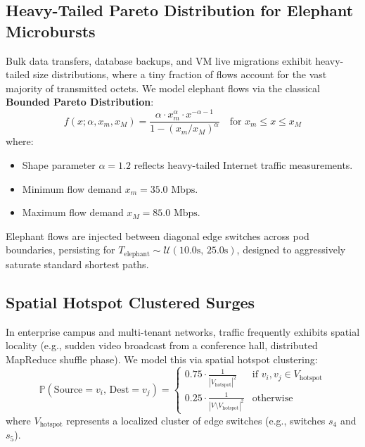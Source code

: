 \subsection{Heavy-Tailed Pareto Distribution for Elephant Microbursts}
Bulk data transfers, database backups, and VM live migrations exhibit heavy-tailed size distributions, where a tiny fraction of flows account for the vast majority of transmitted octets. We model elephant flows via the classical \textbf{Bounded Pareto Distribution}:
\begin{equation}
    f(x; \alpha, x_m, x_M) = \frac{\alpha \cdot x_m^\alpha \cdot x^{-\alpha - 1}}{1 - (x_m / x_M)^\alpha} \quad \text{for } x_m \le x \le x_M
\end{equation}
where:
\begin{itemize}
    \item Shape parameter $\alpha = 1.2$ reflects heavy-tailed Internet traffic measurements.
    \item Minimum flow demand $x_m = 35.0\text{ Mbps}$.
    \item Maximum flow demand $x_M = 85.0\text{ Mbps}$.
\end{itemize}
Elephant flows are injected between diagonal edge switches across pod boundaries, persisting for $T_{\text{elephant}} \sim \mathcal{U}(10.0\text{s}, \, 25.0\text{s})$, designed to aggressively saturate standard shortest paths.

\subsection{Spatial Hotspot Clustered Surges}
In enterprise campus and multi-tenant networks, traffic frequently exhibits spatial locality (e.g., sudden video broadcast from a conference hall, distributed MapReduce shuffle phase). We model this via spatial hotspot clustering:
\begin{equation}
    \mathbb{P}(\text{Source} = v_i, \, \text{Dest} = v_j) = \begin{cases}
        0.75 \cdot \frac{1}{|V_{\text{hotspot}}|^2} & \text{if } v_i, v_j \in V_{\text{hotspot}} \\[0.5em]
        0.25 \cdot \frac{1}{|V \setminus V_{\text{hotspot}}|^2} & \text{otherwise}
    \end{cases}
\end{equation}
where $V_{\text{hotspot}}$ represents a localized cluster of edge switches (e.g., switches $s_4$ and $s_5$).

